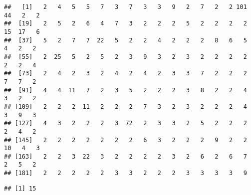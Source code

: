 \documentclass[
]{article}
\newenvironment{Shaded}{\begin{snugshade}}{\end{snugshade}}
\newcommand{\KeywordTok}[1]{\textcolor[rgb]{0.13,0.29,0.53}{\textbf{#1}}}
\newcommand{\NormalTok}[1]{#1}
\newcommand{\OperatorTok}[1]{\textcolor[rgb]{0.81,0.36,0.00}{\textbf{#1}}}
\begin{document}
\begin{verbatim}
##   [1]   2   4   5   5   7   3   7   3   3   9   2   7   2   2 101  44   2   2
##  [19]   2   5   2   6   4   7   3   2   2   2   5   2   2   2   2  15  17   6
##  [37]   5   2   7   7  22   5   2   2   4   2   2   2   8   6   5   4   2   2
##  [55]   2  25   5   2   5   2   3   9   3   2   3   2   2   2   2   2   2   4
##  [73]   2   4   2   3   2   4   2   4   2   3   3   7   2   2   2   7   7   2
##  [91]   4   4  11   7   2   3   5   2   2   2   3   8   2   2   4   3   2   2
## [109]   2   2   2  11   2   2   2   7   3   2   3   2   2   2   4   3   9   3
## [127]   4   3   2   2   2   3  72   2   3   3   2   5   2   2   2   2   4   2
## [145]   2   2   2   2   2   2   2   6   3   2   2   2   9   2   2  10   4   3
## [163]   2   2   3  22   3   2   2   2   2   3   2   6   2   6   7   2   5   2
## [181]   2   2   2   2   2   3   3   2   2   2   3   3   3   3   9
\end{verbatim}

\begin{Shaded}
\end{Shaded}

\begin{verbatim}
## [1] 15
\end{verbatim}
\end{document}
